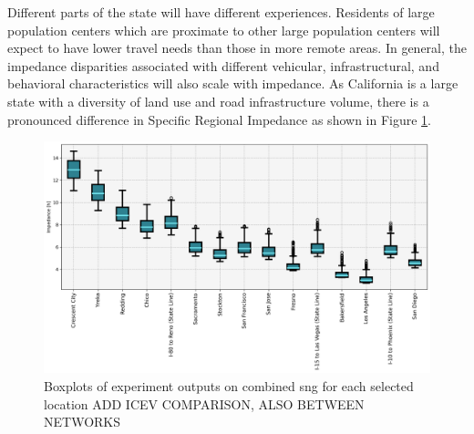 \documentclass[11pt]{article}
\begin{document}
\begin{multicols}{2}
Different parts of the state will have different experiences. Residents of large population centers which are proximate to other large population centers will expect to have lower travel needs than those in more remote areas. In general, the impedance disparities associated with different vehicular, infrastructural, and behavioral characteristics will also scale with impedance. As California is a large state with a diversity of land use and road infrastructure volume, there is a pronounced difference in Specific Regional Impedance as shown in Figure \ref{fig:networks_boxplots_locations}.

\end{multicols}

\begin{figure}[H]
	\centering
	\includegraphics[width = \linewidth]{figs/Networks_Boxplots_Weighted_Specific_Impedance.png}
	\caption{Boxplots of experiment outputs on combined \gls{sng} for each selected location ADD ICEV COMPARISON, ALSO BETWEEN NETWORKS}
	\label{fig:networks_boxplots_locations}
\end{figure}
\end{document}
